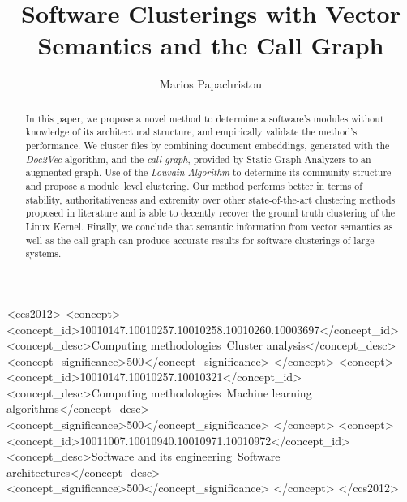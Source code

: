 \documentclass[sigconf]{acmart}
\begin{document}
%
\title{Software Clusterings with Vector Semantics and 
the Call Graph}

%
\author{Marios Papachristou}


\renewcommand{\shortauthors}{Papachristou}

\begin{abstract}

In this paper, we propose a novel method to determine a software's modules without 
knowledge of its architectural structure, and empirically validate the method's performance. We cluster files by combining document embeddings, generated with the  \emph{Doc2Vec} algorithm, and the \emph{call graph}, provided by Static Graph Analyzers to an augmented graph. Use of the \emph{Louvain Algorithm} to determine its community structure and propose a module--level clustering. 
Our method performs better in terms of stability, authoritativeness 
and extremity over other state-of-the-art clustering methods proposed in literature and is able to decently 
recover the ground truth clustering of the Linux Kernel. 
Finally, we conclude that semantic information from vector semantics as well as the call graph can produce 
accurate results for software clusterings of large systems.

\end{abstract}

%
%
\begin{CCSXML}
<ccs2012>
<concept>
<concept_id>10010147.10010257.10010258.10010260.10003697</concept_id>
<concept_desc>Computing methodologies~Cluster analysis</concept_desc>
<concept_significance>500</concept_significance>
</concept>
<concept>
<concept_id>10010147.10010257.10010321</concept_id>
<concept_desc>Computing methodologies~Machine learning algorithms</concept_desc>
<concept_significance>500</concept_significance>
</concept>
<concept>
<concept_id>10011007.10010940.10010971.10010972</concept_id>
<concept_desc>Software and its engineering~Software architectures</concept_desc>
<concept_significance>500</concept_significance>
</concept>
</ccs2012>
\end{CCSXML}
\end{document}
